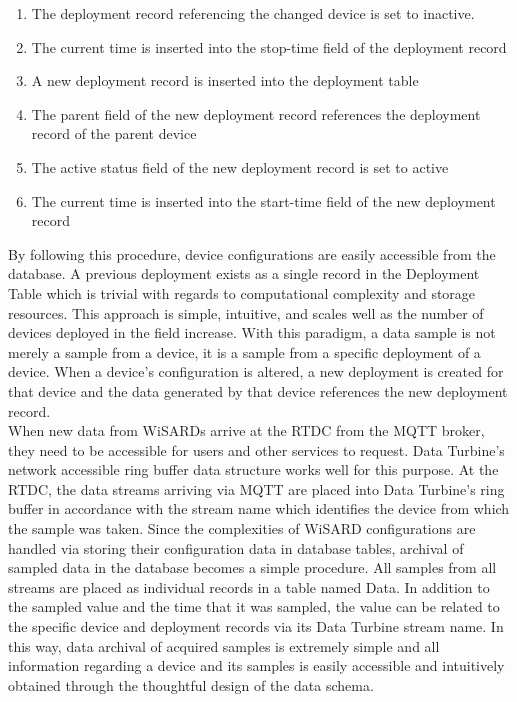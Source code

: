 \begin{enumerate}
	\item The deployment record referencing the changed device is set to inactive.
	\item The current time is inserted into the stop-time field of the deployment record
	\item A new deployment record is inserted into the deployment table
	\item The parent field of the new deployment record references the deployment record of the parent device
	\item The active status field of the new deployment record is set to active
	\item The current time is inserted into the start-time field of the new deployment record
\end{enumerate}

By following this procedure, device configurations are easily accessible from the database. A previous deployment exists as a single record in the Deployment Table which is trivial with regards to computational complexity and storage resources. This approach is simple, intuitive, and scales well as the number of devices deployed in the field increase. With this paradigm, a data sample is not merely a sample from a device,  it is a sample from a specific deployment of a device. When a device's configuration is altered, a new deployment is created for that device and the data generated by that device references the new deployment record.\\

When new data from WiSARDs arrive at the RTDC from the MQTT broker, they need to be accessible for users and other services to request. Data Turbine's network accessible ring buffer data structure works well for this purpose. At the RTDC, the data streams arriving via MQTT are placed into Data Turbine's ring buffer in accordance with the stream name which identifies the device from which the sample was taken. Since the complexities of WiSARD configurations are handled via storing their configuration data in database tables, archival of sampled data in the database becomes a simple procedure. All samples from all streams are placed as individual records in a table named Data. In addition to the sampled value and the time that it was sampled, the value can be related to the specific device and deployment records via its Data Turbine stream name. In this way, data archival of acquired samples is extremely simple and all information regarding a device and its samples is easily accessible and intuitively obtained through the thoughtful design of the data schema. 

